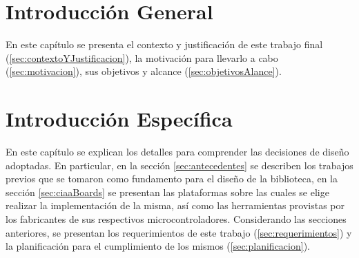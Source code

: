 \documentclass[
11pt, %
spanish,
singlespacing, %
parskip, %
headsepline, %
]{MastersDoctoralThesis} %
\begin{document}

\newcommand{\titulo}[1]{\bigskip \noindent\textbf{#1} \\} %
\newcommand{\subtitulo}[1]{\bigskip \noindent\textit{#1} \\} %



\chapter{Introducción General}
\label{ChapterIntroGral}

En este capítulo se presenta el contexto y justificación de este trabajo final (\ref{sec:contextoYJustificacion}), la motivación para llevarlo a cabo (\ref{sec:motivacion}), sus objetivos y alcance (\ref{sec:objetivosAlance}).





\chapter{Introducción Específica}
\label{ChapterIntroEsp}

En este capítulo se explican los detalles para comprender las decisiones de diseño adoptadas. En particular, en la sección \ref{sec:antecedentes} se describen los trabajos previos que se tomaron como fundamento para el diseño de la biblioteca, en la sección \ref{sec:ciaaBoards} se presentan las plataformas sobre las cuales se elige realizar la implementación de la misma, así como las herramientas provistas por los fabricantes de sus respectivos microcontroladores. Considerando las secciones anteriores, se presentan los requerimientos de este trabajo (\ref{sec:requerimientos}) y la planificación para el cumplimiento de los mismos (\ref{sec:planificacion}).

 
 
 
 
\end{document}
